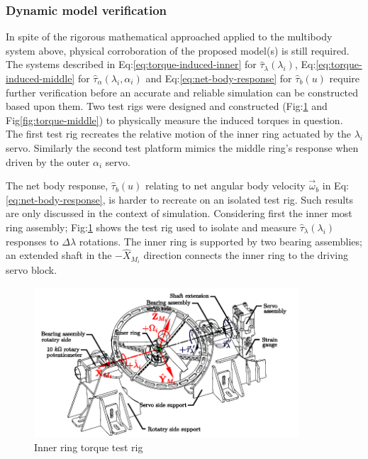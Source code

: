 \subsubsection{Dynamic model verification}
\label{subsubsec:dynamicmodel}
In spite of the rigorous mathematical approached applied to the multibody system above, physical corroboration of the proposed model(s) is still required. The systems described in Eq:\ref{eq:torque-induced-inner} for $\hat{\tau}_\lambda(\lambda_i)$, Eq:\ref{eq:torque-induced-middle} for $\hat{\tau}_\alpha(\lambda_i,\alpha_i)$ and Eq:\ref{eq:net-body-response} for $\hat{\tau}_b(u)$ require further verification before an accurate and reliable simulation can be constructed based upon them. Two test rigs were designed and constructed (Fig:\ref{fig:torque-inner} and Fig\ref{fig:torque-middle}) to physically measure the induced torques in question. The first test rig recreates the relative motion of the inner ring actuated by the $\lambda_i$ servo. Similarly the second test platform mimics the middle ring's response when driven by the outer $\alpha_i$ servo. 
\par
The net body response, $\hat{\tau}_b(u)$ relating to net angular body velocity $\vec{\omega}_b$ in Eq:\ref{eq:net-body-response}, is harder to recreate on an isolated test rig. Such results are only discussed in the context of simulation. Considering first the inner most ring assembly; Fig:\ref{fig:torque-inner} shows the test rig used to isolate and measure $\hat{\tau}_\lambda(\lambda_i)$ responses to $\Delta\lambda$ rotations. The inner ring is supported by two bearing assemblies; an extended shaft in the $-\hat{X}_{M_i}$ direction connects the inner ring to the driving servo block.
\par
\begin{figure}[htpb]
\centering
\includegraphics[width=0.88\textwidth]{figs/torque-inner}
\caption{Inner ring torque test rig}
\label{fig:torque-inner}
\vspace{-12pt}
\end{figure}
